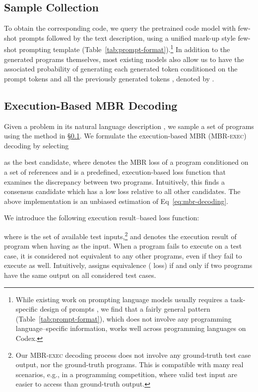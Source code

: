 \documentclass[11pt]{article}
\newcommand{\interalia}[1]{\citep[\textit{inter alia}]{#1}}
\newcommand{\mbrexec}{\textsc{MBR-exec}\xspace}
\begin{document}
\subsection{Sample Collection}
\label{sec:sample-collection}
To obtain the corresponding code, we query the pretrained code model with few-shot prompts followed by the text description, using a unified mark-up style few-shot prompting template (Table~\ref{tab:prompt-format}).\footnote{While existing work on prompting language models usually requires a task-specific design of prompts \interalia{shin-etal-2020-autoprompt,zhong-etal-2021-factual,gao-etal-2021-making}, we find that a fairly general pattern (Table~\ref{tab:prompt-format}), which does not involve any programming language--specific information, works well across programming languages on Codex.} 
In addition to the generated programs themselves, most existing models also allow us to have the associated probability of generating each generated token  conditioned on the prompt tokens  and all the previously generated tokens , denoted by . 

\subsection{Execution-Based MBR Decoding}
\label{sec:mbr-exec}
Given a problem in its natural language description , we sample a set of programs  using the method in \S\ref{sec:sample-collection}. We formulate the execution-based MBR (\mbrexec) decoding by selecting

as the best candidate, where  denotes the MBR loss of a program conditioned on a set of references and  is a predefined, execution-based loss function that examines the discrepancy between two programs. Intuitively, this finds a consensus candidate which has a low loss relative to all other candidates. The above implementation is an unbiased estimation of Eq~\eqref{eq:mbr-decoding}.

We introduce the following execution result--based loss function:

where  is the set of available test inputs,\footnote{Our \mbrexec decoding process does not involve any ground-truth test case output, nor the ground-truth programs. This is compatible with many real scenarios, e.g., in a programming competition, where valid test input are easier to access than ground-truth output.} and  denotes the execution result of program  when having  as the input. When a program fails to execute on a test case, it is considered not equivalent to any other programs, even if they fail to execute as well. Intuitively,  assigns equivalence ( loss) if and only if two programs have the same output on all considered test cases.
\end{document}
